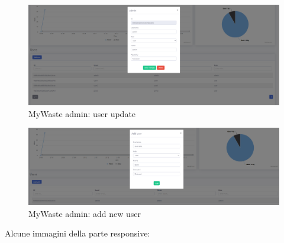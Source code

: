\documentclass{report}
\begin{document}
\begin{figure}[h!]
    \begin{center}
        \includegraphics[width=1.0\textwidth]{images/updateUserData.PNG}  \end{center}
    \caption{MyWaste admin: user update}
    \label{fig: userUpdate}
\end{figure}
\begin{figure}[h!]
    \begin{center}
        \includegraphics[width=1.0\textwidth]{images/addNewUser.PNG}  \end{center}
    \caption{MyWaste admin: add new user}
    \label{fig: addNewUser}
\end{figure}
Alcune immagini della parte responsive:
\end{document}
